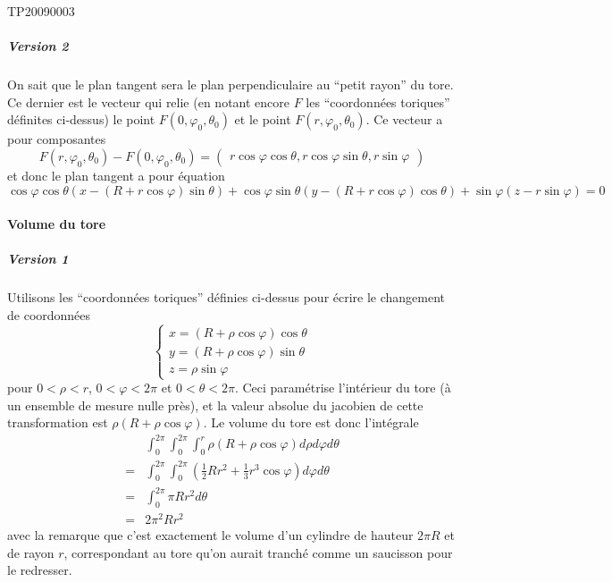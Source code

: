 \begin{corrige}{TP20090003}
	\subparagraph{Version 2}
	On sait que le plan tangent sera le plan perpendiculaire au ``petit
	rayon'' du tore. Ce dernier est le vecteur qui relie (en notant encore
	$F$ les ``coordonnées toriques'' définites ci-dessus) le point
	$F(0,\varphi_0,\theta_0)$ et le point $F(r,\varphi_0,\theta_0)$. Ce
	vecteur a pour composantes
	\begin{equation*}
		F(r,\varphi_0,\theta_0) - F(0,\varphi_0,\theta_0) =
		\begin{pmatrix}
			r \cos \varphi \cos \theta,r \cos \varphi \sin \theta,r \sin
			\varphi
		\end{pmatrix}
	\end{equation*}
	et donc le plan tangent a pour équation
	\begin{equation*}
		\cos \varphi \cos \theta (x - (R + r \cos \varphi)\sin\theta) + \cos
		\varphi \sin \theta (y - (R + r \cos \varphi)\cos\theta) + \sin
		\varphi (z - r \sin \varphi) = 0
	\end{equation*}

	\paragraph{Volume du tore}

	\subparagraph{Version 1}
	Utilisons les ``coordonnées toriques'' définies ci-dessus pour écrire
	le changement de coordonnées
	\begin{equation*}
		\begin{cases}
			x = (R + \rho\cos \varphi) \cos \theta \\
			y = (R + \rho\cos \varphi) \sin \theta \\
			z = \rho \sin \varphi%
		\end{cases}
	\end{equation*}
	pour $0 < \rho < r$, $0 < \varphi < 2\pi$ et $0 < \theta < 2\pi$. Ceci
	paramétrise l'intérieur du tore (à un ensemble de mesure nulle près),
	et la valeur absolue du jacobien de cette transformation est $\rho (R
		+ \rho \cos \varphi)$. Le volume du tore est donc l'intégrale
	\begin{equation*}
		\begin{split}
			  & \int_0^{2\pi} \int_0^{2\pi} \int_0^r \rho (R + \rho \cos \varphi) d\rho d\varphi  d\theta \\
			= & \int_0^{2\pi} \int_0^{2\pi} \left(\frac12 R r^2 +
			\frac 13 r^3 \cos \varphi\right)  d\varphi  d\theta                                           \\
			= & \int_0^{2\pi}  \pi R r^2  d\theta                                                         \\
			= & 2 \pi^2 R r^2
		\end{split}
	\end{equation*}
	avec la remarque que c'est exactement le volume d'un cylindre de
	hauteur $2\pi R$ et de rayon $r$, correspondant au tore qu'on aurait
	tranché comme un saucisson pour le redresser.



\end{corrige}
